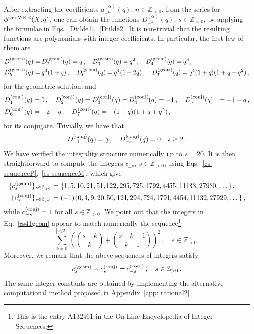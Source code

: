 \documentclass[a4paper,11pt]{article}
\theoremstyle{definition}
\def\IZ{{\mathbb Z}}
\newcommand{\be}{\begin{equation}}
\newcommand{\ee}{\end{equation}}
\newcommand{\ba}{\begin{aligned}}
\newcommand{\ea}{\end{aligned}}
\begin{document}
After extracting the coefficients $a^{(\alpha)}_{\pm n}(q)$, $n \in \IZ_{>0}$, from the series for $\phi^{(\alpha), \rm{WKB}}(X;q)$, one can obtain the functions $D_{\pm s}^{(\alpha)}(q)$, $s \in \IZ_{>0}$, by applying the formulae in Eqs.~\eqref{Dtilde1},~\eqref{Dtilde2}. It is non-trivial that the resulting functions are polynomials with integer coefficients. In particular, the first few of them are
\be
\ba
D^{({\rm geom})}_1(q) &= D^{({\rm geom})}_2(q) = q \, , \quad D^{({\rm geom})}_3(q) = q^2 \, , \quad D^{({\rm geom})}_4(q)=q^3 \, , \\
D^{({\rm geom})}_5(q) &= q^3(1+q) \, , \quad D^{({\rm geom})}_6(q) = q^4 (1 + 2 q) \, , \quad D^{({\rm geom})}_7(q) = q^4 (1 + q) (1 + q + q^2) \, , %
\ea
\ee
for the geometric solution, and
\be
\ba
D^{({\rm conj})}_1(q) &= 0 \, , \quad D^{({\rm conj})}_2(q) = D^{({\rm conj})}_3(q) = D^{({\rm conj})}_4(q)=-1 \, , \quad D^{({\rm conj})}_5(q) &= -1-q \, , \\
 D^{({\rm conj})}_6(q) &= -2-q \, , \quad D^{({\rm conj})}_7(q) = -(1 + q) (1 + q + q^2) \, ,
\ea
\ee
for its conjugate. Trivially, we have that 
\be
D^{({\rm conj})}_{-1}(q) = q \, , \quad D^{({\rm conj})}_{-s}(q) = 0 \quad s \ge 2 \, .
\ee
We have verified the integrality structure numerically up to $s=20$. It is then straightforward to compute the integers $c_{\pm s}$, $s \in \IZ_{>0}$, using Eqs.~\eqref{cs-sequenceP},~\eqref{cs-sequenceM}, which give
%
\begin{subequations}
\begin{align}
\{ c^{(\rm{geom})}_s\}_{s \in \IZ_{>0}}&=\{ 1, 5, 10, 21, 51, 122, 295, 725, 1792, 4455, 11133, 27930,  \dots \} \, , \label{cs41geom} \\
\{ c^{(\rm{conj})}_s\}_{s \in \IZ_{>0}}&= (-1) \{ 0, 4, 9, 20, 50, 121, 294, 724, 1791, 4454, 11132, 27929, \dots \} \, ,  \label{cs41conj}
\end{align}
\end{subequations}
%
while $c^{(\rm{conj})}_{-s} = 1$ for all $s \in \IZ_{>0}$. We point out that the integers in Eq.~\eqref{cs41geom} appear to match numerically the sequence\footnote{This is the entry A$132461$ in the On-Line Encyclopedia of Integer Sequences.}
%
\be
\label{sequence-ex}
\sum_{k=0}^{\left\lfloor s/2 \right\rfloor} \left( {s-k \choose k} + {s-k-1 \choose k-1} \right)^2 \, , \quad s \in \IZ_{>0} \, .
\ee
%
Moreover, we remark that the above sequences of integers satisfy
\be \label{cs-rel41}
c^{(\rm{geom})}_s + c^{(\rm{conj})}_s = c^{(\rm{conj})}_{-s} \, , \quad s \in \IZ_{>0} \, .
\ee
The same integer constants are obtained by implementing the alternative computational method proposed in Appendix~\ref{app: rational2}.
\end{document}
